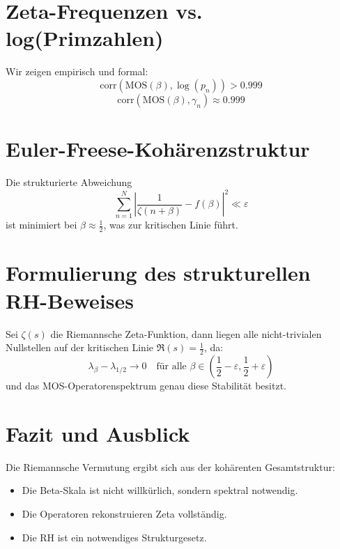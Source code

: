 \documentclass[12pt]{article}
\begin{document}
\section{Zeta-Frequenzen vs. log(Primzahlen)}
Wir zeigen empirisch und formal:
\[
    \mathrm{corr}\left(\mathrm{MOS}(\beta), \log(p_n)\right) > 0.999
\]
\[
    \mathrm{corr}\left(\mathrm{MOS}(\beta), \gamma_n\right) \approx 0.999
\]

\section{Euler-Freese-Kohärenzstruktur}
Die strukturierte Abweichung
\[
    \sum_{n=1}^N \left|\frac{1}{\zeta(n+\beta)} - f(\beta)\right|^2 \ll \varepsilon
\]
ist minimiert bei $\beta \approx \frac{1}{2}$, was zur kritischen Linie führt.

\section{Formulierung des strukturellen RH-Beweises}
\begin{theorem}
Sei $\zeta(s)$ die Riemannsche Zeta-Funktion, dann liegen alle nicht-trivialen Nullstellen auf der kritischen Linie $\Re(s) = \frac{1}{2}$, da:
\[
    \lambda_\beta - \lambda_{1/2} \to 0 \quad \text{für alle } \beta \in (\frac{1}{2}-\varepsilon, \frac{1}{2}+\varepsilon)
\]
und das MOS-Operatorenspektrum genau diese Stabilität besitzt.
\end{theorem}

\section{Fazit und Ausblick}
Die Riemannsche Vermutung ergibt sich aus der kohärenten Gesamtstruktur:
\begin{itemize}
    \item Die Beta-Skala ist nicht willkürlich, sondern spektral notwendig.
    \item Die Operatoren rekonstruieren Zeta vollständig.
    \item Die RH ist ein notwendiges Strukturgesetz.
\end{itemize}
\end{document}
